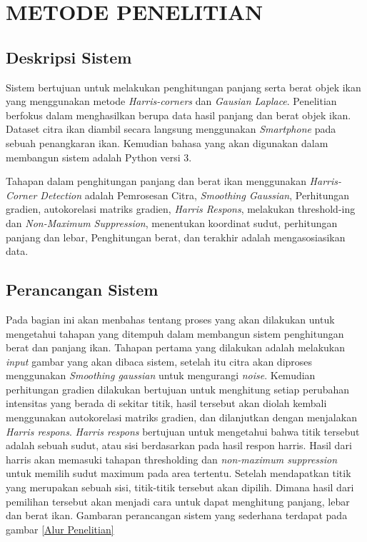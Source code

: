 
\chapter{METODE PENELITIAN}

\section{Deskripsi Sistem}
    Sistem bertujuan untuk melakukan penghitungan panjang serta berat objek ikan yang menggunakan
metode \emph{Harris-corners} dan \emph{Gausian Laplace}. Penelitian berfokus dalam menghasilkan berupa
data hasil panjang dan berat objek ikan. Dataset citra ikan diambil secara langsung menggunakan \emph{Smartphone} pada sebuah
penangkaran ikan. Kemudian bahasa yang akan digunakan dalam membangun sistem adalah Python versi 3.

Tahapan dalam penghitungan panjang dan berat ikan menggunakan \emph{Harris-Corner Detection} adalah Pemrosesan Citra,
\emph{Smoothing Gaussian}, Perhitungan gradien, autokorelasi matriks gradien, \emph{Harris Respons}, melakukan threshold-ing dan \emph{Non-Maximum Suppression}, menentukan koordinat sudut, perhitungan panjang dan lebar, Penghitungan berat,
dan terakhir adalah mengasosiasikan data.

\section{Perancangan Sistem}
    Pada bagian ini akan menbahas tentang proses yang akan dilakukan untuk mengetahui tahapan yang ditempuh
dalam membangun sistem penghitungan berat dan panjang ikan. Tahapan pertama yang dilakukan adalah melakukan \emph{input} gambar
yang akan dibaca sistem, setelah itu citra akan diproses menggunakan \emph{Smoothing gaussian} untuk mengurangi \emph{noise}. Kemudian perhitungan gradien dilakukan bertujuan untuk menghitung setiap perubahan intensitas yang berada di sekitar titik, 
hasil tersebut akan diolah kembali menggunakan autokorelasi matriks gradien, dan dilanjutkan dengan menjalakan \emph{Harris respons}. \emph{Harris respons} bertujuan untuk mengetahui bahwa titik tersebut adalah sebuah sudut, atau sisi berdasarkan pada hasil respon harris. 
Hasil dari harris akan memasuki tahapan thresholding dan \emph{non-maximum suppression} untuk memilih sudut maximum pada area tertentu. Setelah mendapatkan titik yang merupakan sebuah sisi, titik-titik tersebut akan dipilih. 
Dimana hasil dari pemilihan tersebut akan menjadi cara untuk dapat menghitung panjang, lebar dan berat ikan. Gambaran perancangan sistem yang sederhana terdapat pada gambar \ref*{Alur Penelitian}

